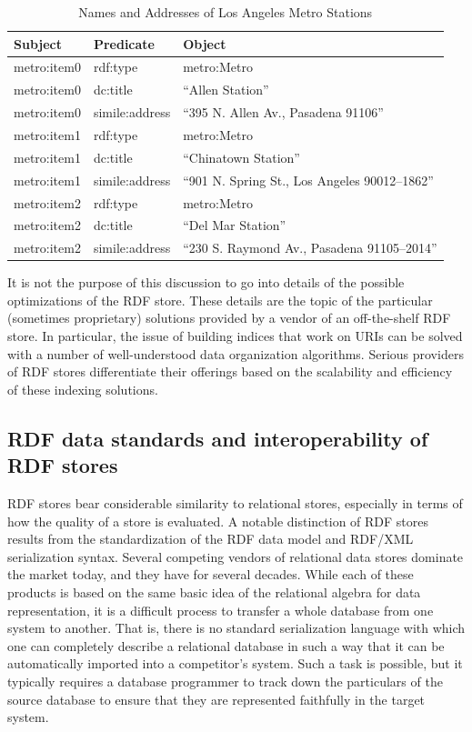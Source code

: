 \begin{table}[h]
\centering
\begin{tabular}{||l l l ||} 
 \hline
 Subject&Predicate&Object \\ [0.5ex] 
 \hline\hline
metro:item0&rdf:type&metro:Metro \\
metro:item0&dc:title&``Allen Station'' \\
metro:item0&simile:address&``395 N. Allen Av., Pasadena 91106'' \\
metro:item1&rdf:type&metro:Metro \\
metro:item1&dc:title&``Chinatown Station'' \\
metro:item1&simile:address&``901 N. Spring St., Los Angeles 90012--1862'' \\
metro:item2&rdf:type&metro:Metro \\
metro:item2&dc:title&``Del Mar Station'' \\
metro:item2&simile:address&``230 S. Raymond Av., Pasadena 91105--2014'' \\
\hline
\end{tabular}
\caption{Names and Addresses of Los Angeles Metro Stations}
\label{tab:ch3.14}
\end{table}





It is not the purpose of this discussion to go into details of the
possible optimizations of the RDF store. These details are the topic of
the particular (sometimes proprietary) solutions provided by a vendor of
an off-the-shelf RDF store. In particular, the issue of building indices
that work on URIs can be solved with a number of well-understood data
organization algorithms. Serious providers of RDF stores differentiate
their offerings based on the scalability and efficiency of these
indexing solutions.

\subsection{RDF data standards and interoperability of RDF stores}

RDF stores bear considerable similarity to relational stores, especially
in terms of how the quality of a store is evaluated. A notable
distinction of RDF stores results from the standardization of the RDF
data model and RDF/XML serialization syntax. Several competing vendors
of relational data stores dominate the market today, and they have for
several decades. While each of these products is based on the same basic
idea of the relational algebra for data representation, it is a
difficult process to transfer a whole database from one system to
another. That is, there is no standard serialization language with which
one can completely describe a relational database in such a way that it
can be automatically imported into a competitor's system. Such a task is
possible, but it typically requires a database programmer to track down
the particulars of the source database to ensure that they are
represented faithfully in the target system.

